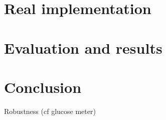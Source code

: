 \chapter{Real implementation}




\chapter{Evaluation and results}


\chapter{Conclusion}
Robustness (cf glucose meter)

